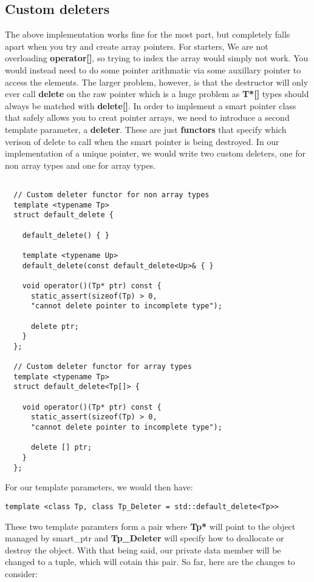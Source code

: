 \documentclass{report}
\begin{document}
\subsection{Custom deleters}
The above implementation works fine for the most part, but completely falls apart when you try and create array pointers. For starters, We are not overloading \textbf{operator[]}, so trying to index the array would simply not work. You would instead need to do some pointer arithmatic via some auxillary pointer to access the elements. The larger problem, however, is that the destructor will only ever call \textbf{delete} on the raw pointer which is a huge problem as \textbf{T*[]} types should always be matched with \textbf{delete[]}.
\bigbreak \noindent
In order to implement a smart pointer class that safely allows you to creat pointer arrays, we need to introduce a second template parameter, a \textbf{deleter}. These are just \textbf{functors} that specify which verison of delete to call when the smart pointer is being destroyed. In our implementation of a unique pointer, we would write two custom deleters, one for non array types and one for array types.
\begin{verbatim}
  
  // Custom deleter functor for non array types
  template <typename Tp> 
  struct default_delete {

    default_delete() { }

    template <typename Up>
    default_delete(const default_delete<Up>& { }

    void operator()(Tp* ptr) const {
      static_assert(sizeof(Tp) > 0, 
      "cannot delete pointer to incomplete type");

      delete ptr;
    }
  };

  // Custom deleter functor for array types
  template <typename Tp> 
  struct default_delete<Tp[]> {

    void operator()(Tp* ptr) const {
      static_assert(sizeof(Tp) > 0, 
      "cannot delete pointer to incomplete type");

      delete [] ptr;
    }
  };
\end{verbatim}
For our template parameters, we would then have:
\begin{verbatim}
template <class Tp, class Tp_Deleter = std::default_delete<Tp>>
\end{verbatim}
These two template paramters form a pair where \textbf{Tp*} will point to the object managed by smart\_ptr and \textbf{Tp\_Deleter} will specify how to deallocate or destroy the object. With that being said, our private data member will be changed to a tuple, which will cotain this pair. So far, here are the changes to consider:
\end{document}
